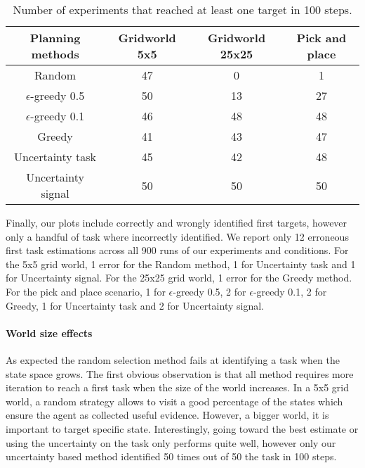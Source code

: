 \begin{table}[!htbp]
\centering
{}
\begin{tabular}{c c c c}
    Planning methods & Gridworld 5x5 & Gridworld 25x25 &  Pick and place \\ \hline
    Random & 47 & 0 & 1 \\ 
    $\epsilon$-greedy 0.5 & 50 & 13 & 27 \\
    $\epsilon$-greedy 0.1 & 46 & 48 & 48 \\
    Greedy & 41 & 43 & 47 \\
    Uncertainty task & 45 & 42 & 48 \\
    Uncertainty signal & 50 & 50 & 50 \\
\end{tabular}
\caption{Number of experiments that reached at least one target in 100 steps.}
\label{tab:wordlpropertiesnreach}
\end{table}


Finally, our plots include correctly and wrongly identified first targets, however only a handful of task where incorrectly identified. We report only 12 erroneous first task estimations across all 900 runs of our experiments and conditions. For the 5x5 grid world, 1 error for the Random method, 1 for Uncertainty task and 1 for Uncertainty signal. For the 25x25 grid world, 1 error for the Greedy method. For the pick and place scenario, 1 for $\epsilon$-greedy 0.5, 2 for $\epsilon$-greedy 0.1, 2 for Greedy, 1 for Uncertainty task and 2 for Uncertainty signal.


\paragraph{World size effects}

As expected the random selection method fails at identifying a task when the state space grows. The first obvious observation is that all method requires more iteration to reach a first task when the size of the world increases. In a 5x5 grid world, a random strategy allows to visit a good percentage of the states which ensure the agent as collected useful evidence. However, a bigger world, it is important to target specific state. Interestingly, going toward the best estimate or using the uncertainty on the task only performs quite well, however only our uncertainty based method identified 50 times out of 50 the task in 100 steps.

